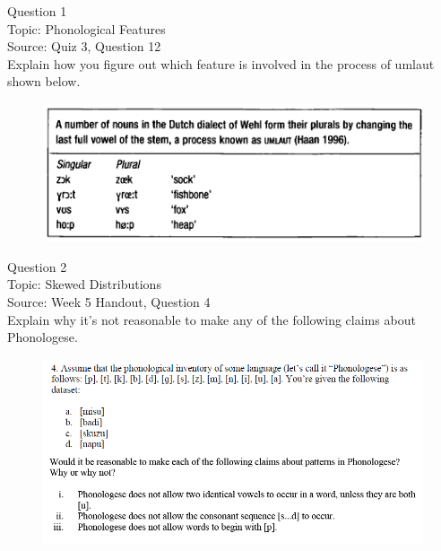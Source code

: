 \documentclass[12pt]{article}
\begin{document}
{\large Question 1}\\

Topic: Phonological Features\\
Source: Quiz 3, Question 12\\

Explain how you figure out which feature is involved in the process of umlaut shown below.\\

\begin{figure}[H]
\includegraphics{../images/dutch.png}
\end{figure}

\newpage

{\large Question 2}\\

Topic: Skewed Distributions\\
Source: Week 5 Handout, Question 4\\

Explain why it's not reasonable to make any of the following claims about Phonologese.\\

\begin{figure}[H]
\includegraphics{../images/Phonologese.png}
\end{figure}

\newpage

\begin{center}
\textbf{{\color{red}{\HUGE END OF EXAM}}}\\

\end{center}
\newpage
\end{document}
